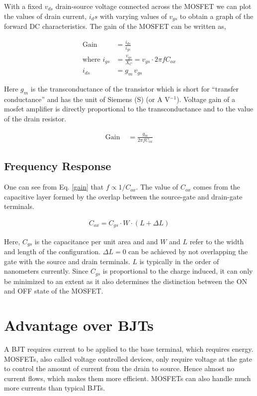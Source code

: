 With a fixed $v_{ds}$ drain-source voltage connected across the MOSFET we can plot the values of drain current, $i_ds$ with varying values of $v_{gs}$ to obtain a graph of the forward DC characteristics. The gain of the MOSFET can be written as,

\begin{align*}
    \text{Gain } &= \frac{i_{ds}}{i_{gs}}\\
    \text{where } i_{gs} &= \frac{v_{gs}}{X_C} = v_{gs}\cdot 2\pi f C_{ox}\\
    i_{ds} &= g_m\,v_{gs}
\end{align*}

Here $g_m$ is the transconductance of the transistor which is short for “transfer conductance” and has the unit of Siemens (S) (or A V$^{-1}$). Voltage gain of a mosfet amplifier is directly proportional to the transconductance and to the value of the drain resistor.

\begin{align}
    \text{Gain } &= \frac{g_m}{2 \pi f C_{ox}} \label{gain}
\end{align}

\subsection*{Frequency Response}
One can see from Eq. \ref{gain} that $f \propto 1/C_{ox}$. 
The value of $C_{ox}$ comes from the capacitive layer formed by the overlap between the source-gate and drain-gate terminals.

\begin{align*}
    C_{ox} = C_{gs} \cdot W \cdot (L+\Delta L)
\end{align*}

Here, $C_{gs}$ is the capacitance per unit area and and $W$ and $L$ refer to the width and length of the configuration. $\Delta L = 0$ can be achieved by not overlapping the gate with the source and drain terminals. $L$ is typically in the order of nanometers currently. Since $C_{gs}$ is proportional to the charge induced, it can only be minimized to an extent as it also determines the distinction between the ON and OFF state of the MOSFET.

\section*{Advantage over BJTs}
A BJT requires current to be applied to the base terminal, which requires energy.
MOSFETs, also called voltage controlled devices, only require voltage at the gate to control the amount of current from the drain to source. Hence almost no current flows, which makes them more efficient. MOSFETs can also handle much more currents than typical BJTs.

